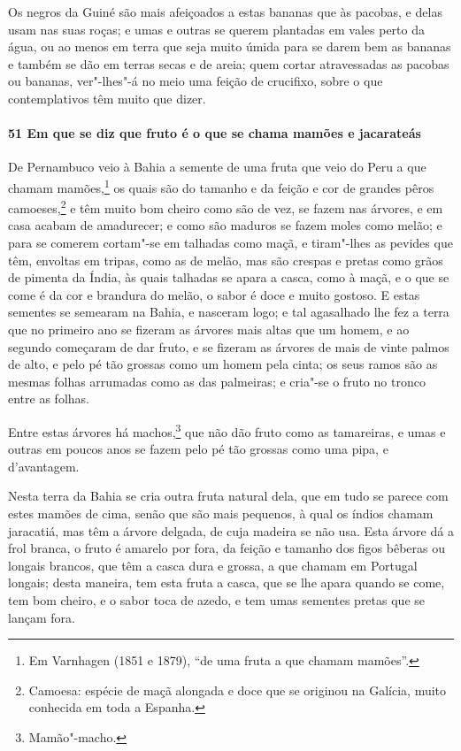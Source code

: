 \begin{linenumbers}
Os negros da Guiné são mais afeiçoados a estas bananas que às pacobas, e delas usam nas
suas roças; e umas e outras se querem plantadas em vales perto da água, ou ao menos em
terra que seja muito úmida para se darem bem as bananas e também se dão em terras secas e
de areia; quem cortar atravessadas as pacobas ou bananas, ver"-lhes"-á no meio uma feição de
crucifixo, sobre o que contemplativos têm muito que dizer.

\paragraph{51 Em que se diz que fruto é o que se chama mamões e jacarateás}\quad
De Pernambuco veio à Bahia a semente de uma fruta que veio do Peru a que chamam
mamões,\footnote{ Em Varnhagen (1851 e 1879), ``de uma fruta a que chamam mamões''.} os
quais são do tamanho e da feição e cor de grandes pêros camoeses,\footnote{ Camoesa:
espécie de maçã alongada e doce que se originou na Galícia, muito conhecida em toda a
Espanha.} e têm muito bom cheiro como são de vez, se fazem nas árvores, e em casa acabam
de amadurecer; e como são maduros se fazem moles como melão; e para se comerem cortam"-se
em talhadas como maçã, e tiram"-lhes as pevides que têm, envoltas em tripas, como as de
melão, mas são crespas e pretas como grãos de pimenta da Índia, às quais talhadas se apara
a casca, como à maçã, e o que se come é da cor e brandura do melão, o sabor é doce e muito
gostoso. E estas sementes se semearam na Bahia, e nasceram logo; e tal agasalhado lhe fez
a terra que no primeiro ano se fizeram as árvores mais altas que um homem, e ao segundo
começaram de dar fruto, e se fizeram as árvores de mais de vinte palmos de alto, e pelo pé
tão grossas como um homem pela cinta; os seus ramos são as mesmas folhas arrumadas como as
das palmeiras; e cria"-se o fruto no tronco entre as folhas.

Entre estas árvores há machos,\footnote{ Mamão"-macho.} que não dão fruto como as
tamareiras, e umas e outras em poucos anos se fazem pelo pé tão grossas como uma pipa, e
d'avantagem.

Nesta terra da Bahia se cria outra fruta natural dela, que em tudo se parece com estes
mamões de cima, senão que são mais pequenos, à qual os índios chamam jaracatiá, mas têm a
árvore delgada, de cuja madeira se não usa. Esta árvore dá a frol branca, o fruto é
amarelo por fora, da feição e tamanho dos figos bêberas ou longais brancos, que têm a
casca dura e grossa, a que chamam em Portugal longais; desta maneira, tem esta fruta a
casca, que se lhe apara quando se come, tem bom cheiro, e o sabor toca de azedo, e tem
umas sementes pretas que se lançam fora.


\end{linenumbers}
